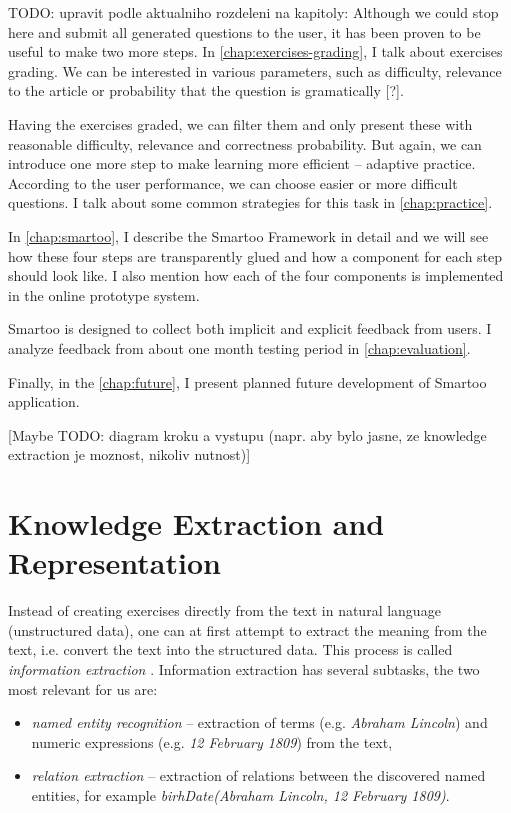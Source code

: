 \documentclass[a4paper, 12pt, twoside]{fithesis2}		%
\renewcommand{\_}{\leavevmode \kern0.07em\vbox{\hrule width0.4em}}
\newcommand{\squarebullet}{\textcolor{black}{\raisebox{0.15em}{\rule{4pt}{4pt}}}}
\newcommand{\emptysquarebullet}{\textcolor{black}{\raisebox{0.10em}{\tiny$\square$}}}
\newenvironment{myItemize}{
  \begin{itemize}[leftmargin=2em,rightmargin=1em,itemsep=\parskip ,parsep=0em,topsep=0em,partopsep=0em]
  \renewcommand{\labelitemi}{\squarebullet}
  \renewcommand{\labelitemii}{\textbullet}
}{
  \end{itemize}
}
\begin{document}
TODO: upravit podle aktualniho rozdeleni na kapitoly: Although we could stop here and submit all generated questions to the user, it has been proven to be useful to make two more steps.
In \autoref{chap:exercises-grading}, I talk about exercises grading.
We can be interested in various parameters, such as difficulty, relevance to the article or probability that the question is gramatically [?].

Having the exercises graded, we can filter them and only present these with reasonable difficulty, relevance and correctness probability.
But again, we can introduce one more step to make learning more efficient -- adaptive practice.
According to the user performance, we can choose easier or more difficult questions. I talk about some common strategies for this task in \autoref{chap:practice}.

In \autoref{chap:smartoo}, I describe the Smartoo Framework in detail
and we will see how these four steps are transparently glued and how a component for each step should look like.
I also mention how each of the four components is implemented in the online prototype system.

Smartoo is designed to collect both implicit and explicit feedback from users.
I analyze feedback from about one month testing period in \autoref{chap:evaluation}.

Finally, in the \autoref{chap:future}, I present planned future development of Smartoo application.




[Maybe TODO: diagram kroku a vystupu (napr. aby bylo jasne, ze knowledge extraction je moznost, nikoliv nutnost)]



\chapter{Knowledge Extraction and Representation}
\label{chap:knowledge}

Instead of creating exercises directly from the text in natural language (unstructured data),
one can at first attempt to extract the meaning from the text,
i.e. convert the text into the structured data.
This process is called \textit{information extraction} \cite[][262]{nlp-python}.
Information extraction has several subtasks, the two most relevant for us are:
\begin{myItemize}
  \item \textit{named entity recognition} -- extraction of terms (e.g. \textit{Abraham Lincoln}) and numeric expressions (e.g. \emph{12 February 1809}) from the text,
  \item \textit{relation extraction} -- extraction of relations between the discovered named entities,
    for example \emph{birhDate(Abraham Lincoln, 12 February 1809)}.
\end{myItemize}
\end{document}
